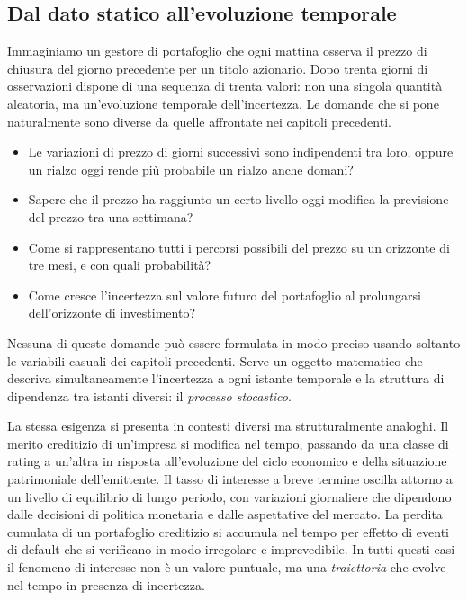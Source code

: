 \subsection{Dal dato statico all'evoluzione temporale}

Immaginiamo un gestore di portafoglio che ogni mattina osserva il prezzo
di chiusura del giorno precedente per un titolo azionario. Dopo trenta
giorni di osservazioni dispone di una sequenza di trenta valori: non una
singola quantit\`{a} aleatoria, ma un'evoluzione temporale dell'incertezza.
Le domande che si pone naturalmente sono diverse da quelle affrontate nei
capitoli precedenti.

\begin{itemize}

\item Le variazioni di prezzo di giorni successivi sono indipendenti tra
loro, oppure un rialzo oggi rende pi\`{u} probabile un rialzo anche domani?

\item Sapere che il prezzo ha raggiunto un certo livello oggi modifica la
previsione del prezzo tra una settimana?

\item Come si rappresentano tutti i percorsi possibili del prezzo su un
orizzonte di tre mesi, e con quali probabilit\`{a}?

\item Come cresce l'incertezza sul valore futuro del portafoglio al
prolungarsi dell'orizzonte di investimento?

\end{itemize}

Nessuna di queste domande pu\`{o} essere formulata in modo preciso usando
soltanto le variabili casuali dei capitoli precedenti. Serve un oggetto
matematico che descriva simultaneamente l'incertezza a ogni istante
temporale e la struttura di dipendenza tra istanti diversi: il
\emph{processo stocastico}.

La stessa esigenza si presenta in contesti diversi ma strutturalmente
analoghi. Il merito creditizio di un'impresa si modifica nel tempo,
passando da una classe di rating a un'altra in risposta all'evoluzione
del ciclo economico e della situazione patrimoniale dell'emittente. Il
tasso di interesse a breve termine oscilla attorno a un livello di
equilibrio di lungo periodo, con variazioni giornaliere che dipendono
dalle decisioni di politica monetaria e dalle aspettative del mercato.
La perdita cumulata di un portafoglio creditizio si accumula nel tempo
per effetto di eventi di default che si verificano in modo irregolare e
imprevedibile. In tutti questi casi il fenomeno di interesse non \`{e}
un valore puntuale, ma una \emph{traiettoria} che evolve nel tempo in
presenza di incertezza.

